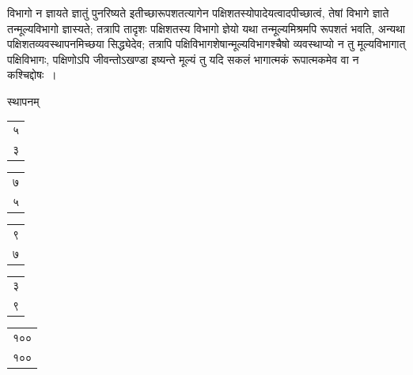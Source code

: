 \documentclass[10pt, openany]{book}
\begin{document}
{{\newpage

{विभागो न ज्ञायते ज्ञातुं पुनरिष्यते इतीच्छारूपशतत्यागेन
पक्षिशतस्योपादेयत्वादपीच्छात्वं,}
{तेषां विभागे ज्ञाते तन्मूल्यविभागो ज्ञास्यते; तत्रापि तादृशः पक्षिशतस्य
विभागो ज्ञेयो यथा}
{तन्मूल्यमिश्रमपि रूपशतं भवति, अन्यथा पक्षिशतव्यवस्थापनमिच्छया
सिद्ध्येदेव; तत्रापि}
{पक्षिविभागशेषान्मूल्यविभागश्चैषो व्यवस्थाप्यो न तु मूल्यविभागात्
पक्षिविभागः, पक्षिणोऽपि}
{जीवन्तोऽखण्डा इष्यन्ते मूल्यं तु यदि सकलं भागात्मकं रूपात्मकमेव वा न
कश्चिद्दोषः~।}

\vspace{3mm}
 स्थापनम्\textendash \,\begin{tabular}{r|}५\\ ३\end{tabular}\begin{tabular}{r|} ७\\ ५\end{tabular}\begin{tabular}{r|}९\\ ७ \end{tabular}\begin{tabular}{r|}३ \\ ९ \end{tabular}\begin{tabular}{r}१००\\ १००\end{tabular}
\vspace{3mm}

}}
\end{document}
